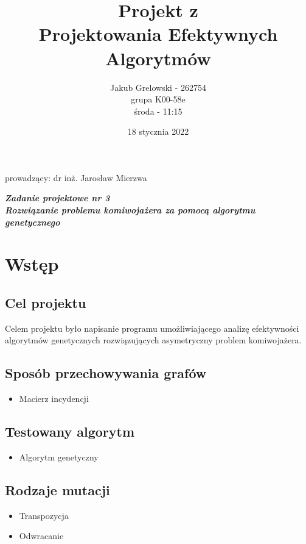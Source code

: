 \documentclass{article}
\title{\vspace{4cm} \textbf{Projekt z \\ Projektowania Efektywnych Algorytmów}}
\author{Jakub Grelowski - 262754 \\
        grupa K00-58e \\
        środa - 11:15}
\date{18 stycznia 2022}
\begin{document}
\maketitle

\begin{center}

\large prowadzący: dr inż. Jarosław Mierzwa 

\vspace{1cm}

\Large \textbf{\textit{Zadanie projektowe nr 3 \\ \vspace{1cm} Rozwiązanie problemu komiwojażera za pomocą algorytmu genetycznego}}     
\end{center}

\vspace{1cm}

\newpage

\tableofcontents

\newpage
\section{Wstęp}
\subsection{Cel projektu}
Celem projektu było napisanie programu umożliwiającego analizę efektywności algorytmów genetycznych rozwiązujących asymetryczny problem komiwojażera. 

\subsection{Sposób przechowywania grafów}
\begin{itemize}
    \item Macierz incydencji
\end{itemize}
\subsection{Testowany algorytm}
\begin{itemize}
    \item Algorytm genetyczny
\end{itemize}
\subsection{Rodzaje mutacji}
\begin{itemize}
    \item Transpozycja
    \item Odwracanie
\end{itemize}
\end{document}
